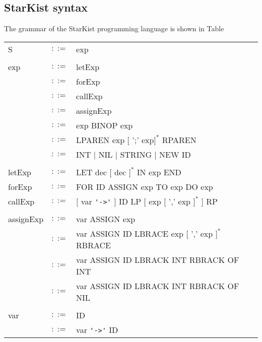 \documentclass{article}
\begin{document}
\subsection{StarKist syntax}
The grammar of the StarKist programming language is shown in Table 
\begin{table}[h]
\centering
\begin{tabular}{ l c l }
  S                & $::=$ & exp                                                 \\ \\
  exp              & $::=$ & letExp                                              \\
                   & $::=$ & forExp                                              \\
                   & $::=$ & callExp                                             \\
                   & $::=$ & assignExp                                           \\
                   & $::=$ & exp BINOP exp                                       \\
                   & $::=$ & LPAREN exp $[$ ';' exp$]^{*}$ RPAREN                \\
                   & $::=$ & INT $|$ NIL $|$ STRING $|$ NEW ID                   \\ \\
  letExp           & $::=$ & LET dec $[$ dec $]^{*}$ IN exp END                  \\
  forExp           & $::=$ & FOR ID ASSIGN exp TO exp DO exp                     \\
  callExp          & $::=$ & $[$ var \verb"'->'" $]$ ID LP $[$ exp $[$ ',' exp $]^{*}$ $]$ RP \\ \\
  assignExp        & $::=$ & var ASSIGN exp                                      \\
                   & $::=$ & var ASSIGN ID LBRACE exp $[$ ',' exp $]^{*}$ RBRACE \\
                   & $::=$ & var ASSIGN ID LBRACK INT RBRACK OF INT              \\
                   & $::=$ & var ASSIGN ID LBRACK INT RBRACK OF NIL              \\ \\
  var              & $::=$ & ID                                                  \\
                   & $::=$ & var \verb"'->'" ID                                  \\

\end{tabular}
\end{table}
\end{document}
